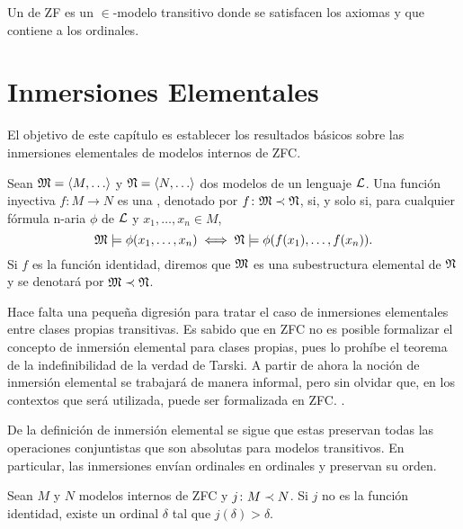 \begin{defi}
    Un  de ZF es un $\in$-modelo transitivo
    donde se satisfacen los axiomas y que contiene a los ordinales.
\end{defi}

\section{Inmersiones Elementales}
\label{sec:elem-embed}

El objetivo de este capítulo es establecer los resultados básicos
sobre las inmersiones elementales de modelos internos de ZFC.

\begin{defi}
    Sean $\model{M} = \op{M,\dots}$ y $\model{N} = \op{N,\dots}$ dos modelos de un lenguaje $\mathcal { L }$.
    Una función inyectiva $f\colon M\to N$ es una ,
    denotado por $f\colon \mathfrak { M }\prec\mathfrak { N }$, si, y solo si, para cualquier fórmula
    n-aria $\phi$ de $\mathcal { L }$ y $x_1,\dots,x_n \in M$,
    \[
        \mathfrak { M }\models\phi(x_1,\dots,x_n) \iff \mathfrak { N }\models\phi(f(x_1),\dots,f(x_n)).
    \]
    Si $f$ es la función identidad, diremos que $\mathfrak { M }$
    es una subestructura elemental de $\mathfrak { N }$ y se denotará por $\mathfrak { M }\prec\mathfrak { N }$.
\end{defi}

Hace falta una pequeña digresión para tratar el caso de inmersiones elementales
entre clases propias transitivas. Es sabido que en ZFC no es posible formalizar
el concepto de inmersión elemental para clases propias, pues lo prohíbe el teorema
de la indefinibilidad de la verdad de Tarski.
A partir de ahora la noción de inmersión elemental se trabajará de manera informal,
pero sin olvidar que, en los contextos que será utilizada, puede ser formalizada
en ZFC.
.

De la definición de inmersión elemental se sigue que estas preservan todas
las operaciones conjuntistas que son absolutas para modelos transitivos.
En particular, las inmersiones envían ordinales en ordinales y
preservan su orden.

\begin{teo}\label{teo:elem-embed-trivial}
    Sean $M$ y $N$ modelos internos de ZFC y $j\colon M\prec N$.
    Si $j$ no es la función identidad, existe un ordinal $\delta$
    tal que $j(\delta)>\delta$.
\end{teo}

